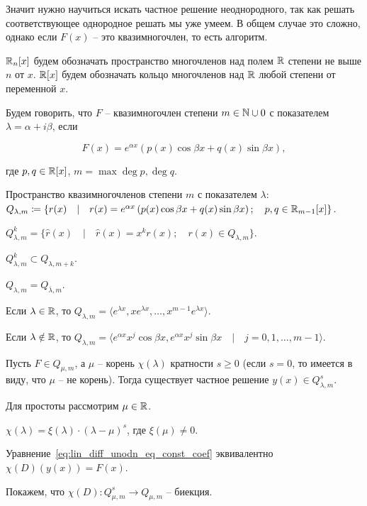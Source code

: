 Значит нужно научиться искать частное решение неоднородного, так как решать соответствующее однородное решать мы уже умеем.
В общем случае это сложно, однако если $F(x)$ -- это квазимногочлен, то есть алгоритм.

\Def $\mathbb{R}_n[x]$ будем обозначать пространство многочленов над полем $\mathbb{R}$ степени не выше $n$ от $x$. $\mathbb{R}[x]$ будем обозначать кольцо многочленов над $\mathbb{R}$ любой степени от переменной $x$.

\Def Будем говорить, что $F$ -- квазимногочлен степени $m \in \mathbb{N} \cup 0$ с показателем $\lambda = \alpha + i\beta$, если

\begin{equation*}
    F(x) = e^{\alpha x} \left( p(x) \cos{\beta x} + q(x) \sin{\beta x}\right),
\end{equation*}

где $p, q \in \mathbb{R}[x]$, $m = \max{\deg p, \deg q}$.

\Def Пространство квазимногочленов степени $m$ с показателем $\lambda$: $Q_{\lambda, m} \coloneqq \{r(x) \quad | \quad r(x) = e^{\alpha x} \left( p(x) \cos{\beta x} + q(x) \sin{\beta x} \right); \quad p, q \in \mathbb{R}_{m-1}[x]\}$.

\Def $Q_{\lambda, m}^k = \{\hat{r}(x) \quad | \quad \hat{r}(x) = x^k r(x); \quad r(x) \in Q_{\lambda, m}\}$.

\Note $Q_{\lambda, m}^k \subset Q_{\lambda, m+k}$.

\Note $Q_{\lambda, m} = Q_{\overline{\lambda}, m}$.

\Note Если $\lambda \in \mathbb{R}$, то $Q_{\lambda, m} = \langle e^{\lambda x}, x e^{\lambda x}, \dots, x^{m-1} e^{\lambda x} \rangle $.

Если $\lambda \notin \mathbb{R}$, то $Q_{\lambda, m} = \langle e^{\alpha x} x^j \cos{\beta x}, e^{\alpha x} x^j \sin{\beta x} \quad|\quad j = 0, 1, \dots, m-1 \rangle$.

\Th Пусть $F \in Q_{\mu, m}$, а $\mu$ -- корень $\chi(\lambda)$ кратности $s \geq 0$ (если $s=0$, то имеется в виду, что $\mu$ -- не корень).
Тогда существует частное решение $y(x) \in Q_{\lambda, m}^s$.

\Proof

Для простоты рассмотрим $\mu \in \mathbb{R}$.

$\chi(\lambda) = \xi(\lambda) \cdot (\lambda - \mu)^s$, где $\xi(\mu) \neq 0$.

Уравнение~\ref{eq:lin_diff_unodn_eq_const_coef} эквивалентно $\chi(D)(y(x)) = F(x)$.

Покажем, что $\chi(D): Q_{\mu, m}^s \rightarrow Q_{\mu, m}$ -- биекция.


